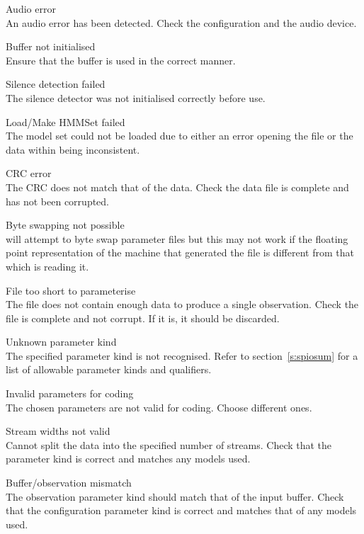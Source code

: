 \begin{itemize}
\begin{itemize}
    Audio error\\
        An audio error has been detected.  Check the  
        configuration and the audio device.

    Buffer not initialised\\
        Ensure that the buffer is used in the correct manner.

    Silence detection failed\\
        The silence detector was not initialised correctly before use.

    Load/Make HMMSet failed\\
        The model set could not be loaded due to either an error opening the
        file or the data within being inconsistent.

    CRC error\\
        The CRC does not match that of the data.  Check the data file is 
        complete and has not been corrupted.

    Byte swapping not possible\\
         will attempt to byte swap parameter files but this 
        may not work if the floating point representation of the machine 
        that generated the file is different from that which is reading it.

    File too short to parameterise\\
        The file does not contain enough data to produce a single observation.
        Check the file is complete and not corrupt.  If it is, it should be 
        discarded.

    Unknown parameter kind\\
        The specified parameter kind is not recognised.  Refer to 
        section~\ref{s:spiosum} for a list of allowable parameter kinds
        and qualifiers.

    Invalid parameters for coding\\
        The chosen parameters are not valid for coding.  Choose different ones.

    Stream widths not valid\\
        Cannot split the data into the specified number of streams.  Check that
        the parameter kind is correct and matches any models used.

    Buffer/observation mismatch\\
        The observation parameter kind should match that of the input buffer.
        Check that the configuration parameter kind is correct and matches 
        that of any models used.


\end{itemize}
\end{itemize}
